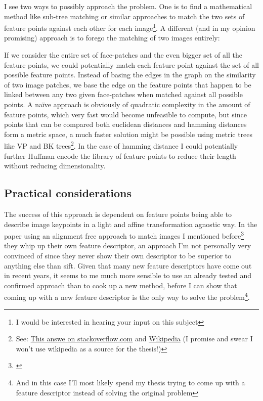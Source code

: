 \documentclass{article}
\begin{document}
I see two ways to possibly approach the problem. One is to find a mathematical 
method like sub-tree matching or similar approaches to match the two sets of 
feature points against each other for each image\footnote{I would be interested 
in hearing your input on this subject}.  A different (and in my opinion 
promising) approach is to forego the matching of two images entirely:

If we consider the entire set of face-patches and the even bigger set of all 
the feature points, we could potentially match each feature point against the 
set of all possible feature points. Instead of basing the edges in the graph on 
the similarity of two image patches, we base the edge on the feature points 
that happen to be linked between any two given face-patches when matched 
against all possible points. A na\"ive approach is obviously of quadratic 
complexity in the amount of feature points, which very fast would become 
unfeasible to compute, but since points that can be compared both euclidean 
distances and hamming distances form a metric space, a much faster solution 
might be possible using metric trees like VP and BK trees\footnote{See: 
\href{http://stackoverflow.com/questions/6389841/efficiently-find-binary-strings-with-low-hamming-distance-in-large-set}{This 
answe on stackoverflow.com} and 
\href{http://en.wikipedia.org/wiki/Metric_tree}{Wikipedia} (I promise and swear 
I won't use wikipedia as a source for the thesis!)
}. In the case of hamming distance I could potentially further Huffman encode 
the library of feature points to reduce their length without reducing 
dimensionality.

\subsection{Practical considerations}

The success of this approach is dependent on feature points being able to 
describe image keypoints in a light and affine transformation agnostic way. In 
the paper using an alignment free approach to match images I mentioned 
before\footnote{\cite{liao2011}} they whip up their own feature descriptor, an 
approach I'm not personally very convinced of since they never show their own 
descriptor to be superior to anything else than sift. Given that many new 
feature descriptors have come out in recent years, it seems to me much more 
sensible to use an already tested and confirmed approach than to cook up a new 
method, before I can show that coming up with a new feature descriptor is the 
only way to solve the problem\footnote{And in this case I'll most likely spend 
my thesis trying to come up with a feature descriptor instead of solving the 
original problem}.
\end{document}

